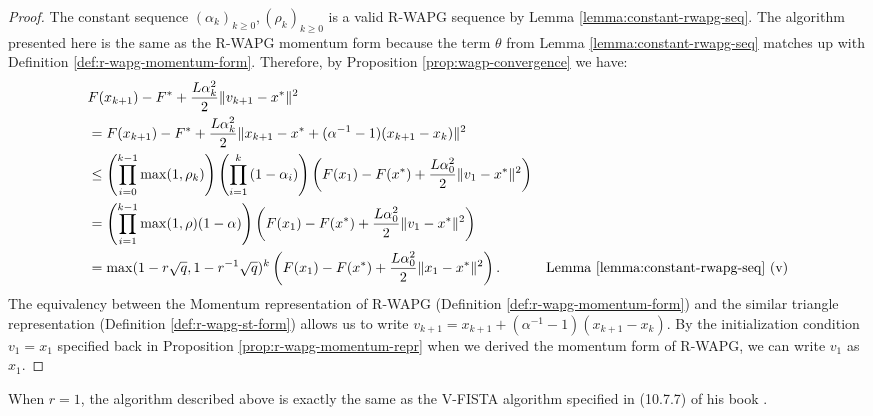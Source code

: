 \documentclass[12pt]{article}
\begin{document}
    \begin{proof}
        The constant sequence $(\alpha_k)_{k \ge 0}, (\rho_k)_{k \ge 0}$ is a valid R-WAPG sequence by Lemma \ref{lemma:constant-rwapg-seq}. 
        The algorithm presented here is the same as the R-WAPG momentum form because the term $\theta$ from Lemma \ref{lemma:constant-rwapg-seq} matches up with Definition \ref{def:r-wapg-momentum-form}. 
        Therefore, by Proposition \ref{prop:wagp-convergence} we have: 
        \begin{align*}
            & F(x_{k + 1}) - F^* + \frac{L\alpha_k^2}{2}\Vert v_{k + 1} - x^*\Vert^2
            \\
            &= 
            F(x_{k + 1}) - F^* + \frac{L\alpha_k^2}{2}\Vert x_{k + 1}  - x^* + (\alpha^{-1} - 1)(x_{k + 1} - x_k)\Vert^2
            \\
            &\le 
            \left(
                \prod_{i = 0}^{k - 1} \max(1, \rho_{k})
            \right)
            \left(
                \prod_{i = 1}^{k} \left(1  - \alpha_i\right)
            \right)
            \left(
                F(x_1) - F(x^*) + \frac{L\alpha_0^2}{2}\Vert v_1 - x^*\Vert^2
            \right)
            \\
            &= \left(
                \prod_{i = 1}^{k - 1} \max(1, \rho)(1 - \alpha)
            \right)
            \left(
                F(x_1) - F(x^*) + \frac{L\alpha_0^2}{2}\Vert v_1 - x^*\Vert^2
            \right)
            \\
            &= \max(1 - r\sqrt{q}, 1 - r^{-1}\sqrt{q})^k
            \left(
                F(x_1) - F(x^*) + \frac{L\alpha_0^2}{2}\Vert x_1 - x^*\Vert^2
            \right). 
            & \text{Lemma \ref{lemma:constant-rwapg-seq} (v)}
        \end{align*}
        The equivalency between the Momentum representation of R-WAPG (Definition \ref{def:r-wapg-momentum-form}) and the similar triangle representation (Definition \ref{def:r-wapg-st-form}) allows us to write $v_{k + 1} = x_{k + 1} + (\alpha^{-1} - 1)(x_{k + 1} - x_k)$. 
        By the initialization condition $v_1 = x_1$ specified back in Proposition \ref{prop:r-wapg-momentum-repr} when we derived the momentum form of R-WAPG, we can write $v_1$ as $x_1$. 
        
    \end{proof}
    \begin{remark}
        When $r = 1$, the algorithm described above is exactly the same as the V-FISTA algorithm specified in (10.7.7) of his book \cite{beck_first-order_2017}. 
    \end{remark}
\end{document}
